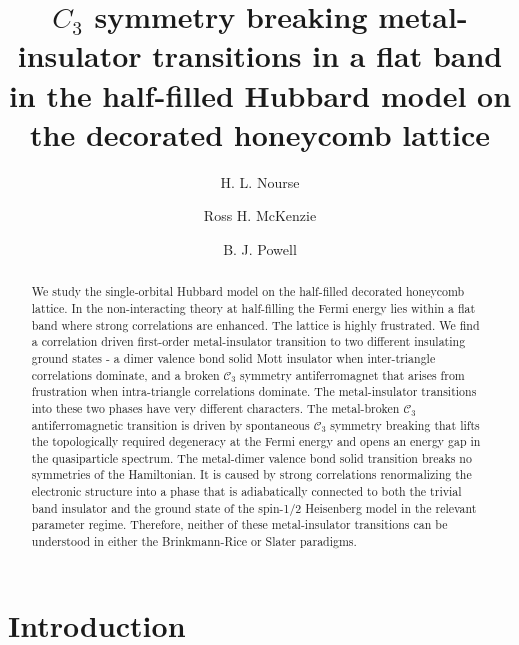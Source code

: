 \documentclass[reprint,aps,prb,amsmath,amssymb]{revtex4-2}
\begin{document}
\title{$C_3$ symmetry breaking metal-insulator transitions in a flat band in the half-filled Hubbard model on the decorated honeycomb lattice}
\author{H. L. Nourse}
\author{Ross H. McKenzie}
\author{B. J. Powell}

\begin{abstract}
We study the single-orbital Hubbard model on the half-filled decorated honeycomb lattice. In the non-interacting theory at half-filling the Fermi energy lies within a flat band where strong correlations are enhanced. The lattice is highly frustrated. We find a correlation driven first-order metal-insulator transition to two different insulating ground states - a dimer valence bond solid Mott insulator when inter-triangle correlations dominate, and a broken $\mathcal{C}_3$ symmetry antiferromagnet that arises from frustration when intra-triangle correlations dominate. The metal-insulator transitions into these two phases have very different characters. The metal-broken $\mathcal{C}_3$ antiferromagnetic transition is driven by spontaneous $\mathcal{C}_3$ symmetry breaking that lifts the topologically required degeneracy at the Fermi energy and opens an energy gap in the quasiparticle spectrum. The metal-dimer valence bond solid transition breaks no symmetries of the Hamiltonian. It is caused by strong correlations renormalizing the electronic structure into a phase that is adiabatically connected to both the trivial band insulator and the ground state of the spin-1/2 Heisenberg model in the relevant parameter regime. Therefore, neither of these metal-insulator transitions can be understood in either the Brinkmann-Rice or Slater paradigms.
\end{abstract}

\maketitle

\section{Introduction} \label{sec:introduction}
\end{document}
